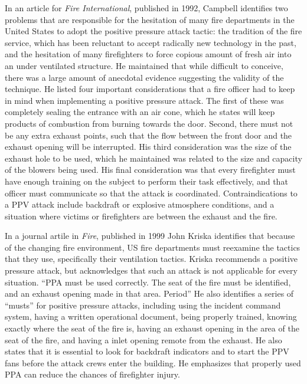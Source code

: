 \documentclass{article}
\begin{document}
In an article for \textit{Fire International}, published in 1992, Campbell identifies two problems that are responsible for the hesitation of many fire departments in the United States to adopt the positive pressure attack tactic: the tradition of the fire service, which has been reluctant to accept radically new technology in the past, and the hesitation of many firefighters to force copious amount of fresh air into an under ventilated structure. He maintained that while difficult to conceive, there was a large amount of anecdotal evidence suggesting the validity of the technique. He listed four important considerations that a fire officer had to keep in mind when implementing a positive pressure attack. The first of these was completely sealing the entrance with an air cone, which he states will keep products of combustion from burning towards the door. Second, there must not be any extra exhaust points, such that the flow between the front door and the exhaust opening will be interrupted. His third consideration was the size of the exhaust hole to be used, which he maintained was related to the size and capacity of the blowers being used. His final consideration was that every firefighter must have enough training on the subject to perform their task effectively, and that officer must communicate so that the attack is coordinated. Contraindications to a PPV attack include backdraft or explosive atmosphere conditions, and a situation where victims or firefighters are between the exhaust and the fire.\cite{traditionvtechnology}

In a journal artile in \textit{Fire}, published in 1999 John Kriska identifies that because of the changing fire environment, US fire departments must reexamine the tactics that they use, specifically their ventilation tactics. Kriska recommends a positive pressure attack, but acknowledges that such an attack is not applicable for every situation. ``PPA must be used correctly. The seat of the fire must be identified, and an exhaust opening made in that area. Period'' He also identifies a series of “musts” for positive pressure attacks, including using the incident command system, having a written operational document, being properly trained, knowing exactly where the seat of the fire is, having an exhaust opening in the area of the seat of the fire, and having a inlet opening remote from the exhaust. He also states that it is essential to look for backdraft indicators and to start the PPV fans before the attack crews enter the building. He emphasizes that properly used PPA can reduce the chances of firefighter injury.\cite{KriskaPPA}
\end{document}
